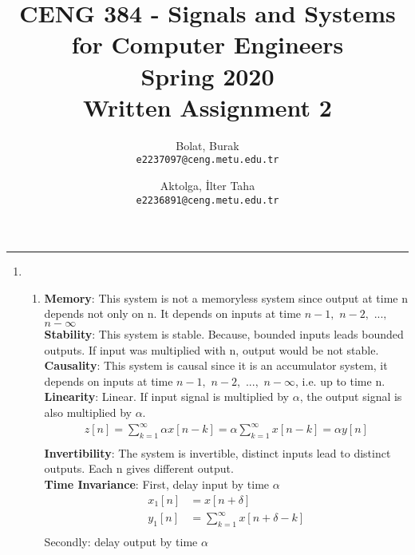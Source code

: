 \documentclass[10pt,a4paper, margin=1in]{article}
\author{
  Bolat, Burak\\
  \texttt{e2237097@ceng.metu.edu.tr}
  \and
  Aktolga, İlter Taha\\
  \texttt{e2236891@ceng.metu.edu.tr}
}
\title{CENG 384 - Signals and Systems for Computer Engineers \\
Spring 2020 \\
Written Assignment 2}
\begin{document}
\maketitle



\noindent\rule{19cm}{1.2pt}

\begin{enumerate}

\item %
    \begin{enumerate}
    \item %
    
    \textbf{Memory}: This system is not a memoryless system since output at time n depends not only on n. It depends on inputs at time $n-1,$ $n-2,$ $...,$ $n-\infty$\\
    \textbf{Stability}: This system is stable. Because, bounded inputs leads bounded outputs. If input was multiplied with n, output would be not stable.\\
    \textbf{Causality}: This system is causal since it is an accumulator system, it depends on inputs at time $n-1,$ $n-2,$ $...,$ $n-\infty$, i.e. up to time n.\\
    \textbf{Linearity}: Linear. If input signal is multiplied by $\alpha$, the output signal is also multiplied by $\alpha$.\\
    \begin{equation}
	\begin{split}
	    z[n] = \sum_{k=1}^{\infty}\alpha x[n-k] = \alpha \sum_{k=1}^{\infty}x[n-k] = \alpha y[n]\\
	\end{split}
	\end{equation}
	\textbf{Invertibility}: The system is invertible, distinct inputs lead to distinct outputs. Each n gives different output.
	\\
	\textbf{Time Invariance}: First, delay input by time $\alpha$\\
	\begin{equation}
	\begin{split}
	    x_1[n] &= x[n+\delta]\\
	    y_1[n] &= \sum^{\infty}_{k=1}x[n+\delta-k]\\
	\end{split}
    \end{equation}
    Secondly: delay output by time $\alpha$\\

\end{enumerate}
\end{enumerate}
\end{document}
